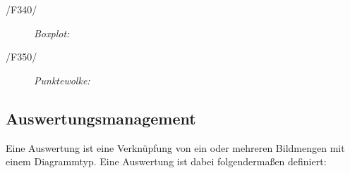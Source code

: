 \begin{description}
		\item[/F340/] \textit{Boxplot:}\par 
		\begin{figure}[htbp]
		 \centering
		\end{figure}


		\item[/F350/] \textit{Punktewolke:}\par		
		\begin{figure}[htbp]
		 \centering
		\end{figure}


	\end{description}

\subsection{Auswertungsmanagement}
\label{subsec:auswertungsmgmt}

	Eine Auswertung ist eine Verknüpfung von ein oder mehreren Bildmengen mit einem Diagrammtyp. Eine Auswertung ist dabei folgendermaßen definiert:

